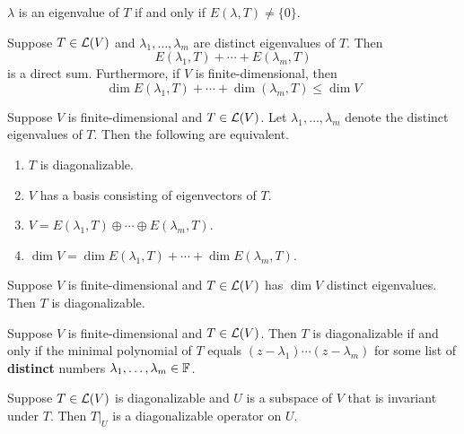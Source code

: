 \documentclass{extarticle}
\begin{document}
\begin{remark}
    \(\lambda\) is an eigenvalue of \(T\) if and only if \(E(\lambda, T) \neq \{0\}\).
\end{remark}

\begin{thm}
    Suppose \(T \in \mathcal{L}(V)\) and \(\lambda_1, \ldots, \lambda_m\) are distinct eigenvalues of \(T\). Then 
    \[E(\lambda_1, T) + \cdots + E(\lambda_m, T)\]
    is a direct sum. Furthermore, if \(V\) is finite-dimensional, then 
    \[\dim E(\lambda_1, T) + \cdots + \dim (\lambda_m, T) \leq \dim V\]
\end{thm}


\begin{thm}
    Suppose \(V\) is finite-dimensional and \(T \in \mathcal{L}(V)\). Let \(\lambda_1, \ldots, \lambda_m\) denote 
    the distinct eigenvalues of \(T\). Then the following are equivalent.
    \begin{enumerate}[label=(\alph*)]
        \item \(T\) is diagonalizable. 
        \item \(V\) has a basis consisting of eigenvectors of \(T\). 
        \item \(V = E(\lambda_1, T) \oplus \cdots \oplus E(\lambda_m, T)\). 
        \item \(\dim V = \dim E(\lambda_1, T) + \cdots + \dim E(\lambda_m, T)\).
    \end{enumerate}
\end{thm}

\begin{corollary}
    Suppose \(V\) is finite-dimensional and \(T \in \mathcal{L}(V)\) has \(\dim V\) distinct eigenvalues. 
    Then \(T\) is diagonalizable.
\end{corollary}


\begin{thm}
    Suppose \(V\) is finite-dimensional and \(T \in \mathcal{L}(V)\). Then \(T\) is diagonalizable if and only if 
    the minimal polynomial of \(T\) equals \((z - \lambda_1)\cdots(z - \lambda_m)\) for some 
    list of \textbf{distinct} numbers \(\lambda_1, \ldots, \lambda_m \in \mathbb{F}\).
\end{thm}

\begin{corollary}
    Suppose \(T \in \mathcal{L}(V)\) is diagonalizable and \(U\) is a subspace of \(V\) that is invariant 
    under \(T\). Then \(T |_U\) is a diagonalizable operator on \(U\). 
\end{corollary}
\end{document}
